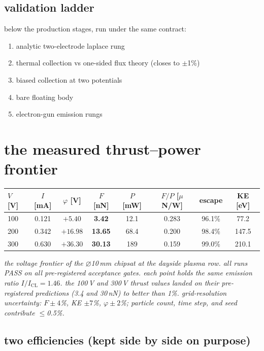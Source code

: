 \documentclass[11pt]{article}
\begin{document}
\subsection{validation ladder}

below the production stages, run under the same contract:
\begin{enumerate}
  \item analytic two-electrode laplace rung
  \item thermal collection vs one-sided flux theory (closes to $\pm$1\%)
  \item biased collection at two potentials
  \item bare floating body
  \item electron-gun emission rungs
\end{enumerate}

\section{the measured thrust--power frontier}

\begin{center}\small
\begin{tabular}{lccccccc}
\toprule
$V$ [V] & $I$ [mA] & $\varphi$ [V] & $F$ [nN] & $P$ [mW] & $F/P$ [$\mu$N/W]
  & escape & KE [eV] \\
\midrule
100 & 0.121 & $+5.40$  & \textbf{3.42}  & 12.1 & 0.283 & 96.1\% & 77.2 \\
200 & 0.342 & $+16.98$ & \textbf{13.65} & 68.4 & 0.200 & 98.4\% & 147.5 \\
300 & 0.630 & $+36.30$ & \textbf{30.13} & 189  & 0.159 & 99.0\% & 210.1 \\
\bottomrule
\end{tabular}
\end{center}
{\small\itshape the voltage frontier of the $\varnothing$10\,mm chipsat at the
dayside plasma row.  all runs PASS on all pre-registered acceptance gates.
each point holds the same emission ratio $I/I_{\mathrm{CL}} = 1.46$.  the
100\,V and 300\,V thrust values landed on their pre-registered predictions
(3.4 and 30\,nN) to better than 1\%.  grid-resolution uncertainty:
$F \pm 4$\%, KE $\pm 7$\%, $\varphi \pm 2$\%; particle count, time step,
and seed contribute $\le$0.5\%.}

\subsection{two efficiencies (kept side by side on purpose)}
\end{document}
